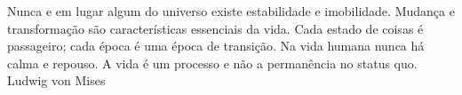 

\begin{epigrafe}
	\vspace*{\fill}
	\begingroup
	\OnehalfSpacing
	\leftskip=4cm
	\noindent%
	Nunca e em lugar algum do universo existe estabilidade e imobilidade. Mudança e transformação são características essenciais da vida. Cada estado de coisas é passageiro; cada época é uma época de transição. Na vida humana nunca há calma e repouso. A vida é um processo e não a permanência no status quo.
	  \flushright
	  Ludwig von Mises
	\par
	\endgroup
\end{epigrafe}